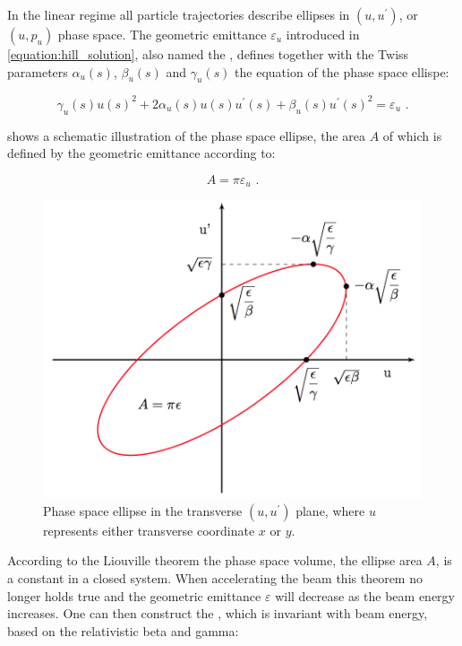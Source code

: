 In the linear regime all particle trajectories describe ellipses in \((u, u^{\prime})\), or \((u, p_u)\) phase space.
The geometric emittance \(\varepsilon_u\) introduced in \cref{equation:hill_solution}, also named the , defines together with the Twiss parameters \(\alpha_u (s)\), \(\beta_u (s)\) and \(\gamma_u (s)\) the equation of the phase space ellispe:

\begin{equation}
    \gamma_{u}(s) u(s)^{2} + 2 \alpha_{u}(s) u(s) u^{\prime}(s) + \beta_{u}(s) u^{\prime}(s)^{2} = \varepsilon_u \text{ .}
    \label{equation:ellipse_equation}
\end{equation}

 shows a schematic illustration of the phase space ellipse, the area \(A\) of which is defined by the geometric emittance according to:

\begin{equation}
    A = \pi \varepsilon_u \text{ .}
    \label{equation:phase_space_ellipse_area}
\end{equation}

\begin{figure}[!htb]
    \begin{center}
    \includegraphics[width = 0.75\linewidth]{Figures/Beam_Dynamics_Theory/phase_space.png}
    \caption{Phase space ellipse in the transverse \((u, u^{\prime})\) plane, where \(u\) represents either transverse coordinate \(x\) or \(y\).}
    \label{figure:phase_space_ellipse}
    \end{center}
\end{figure}

According to the Liouville theorem the phase space volume, the ellipse area \(A\), is a constant in a closed system.
When accelerating the beam this theorem no longer holds true and the geometric emittance \(\varepsilon\) will decrease as the beam energy increases.
One can then construct the , which is invariant with beam energy, based on the relativistic beta and gamma:


